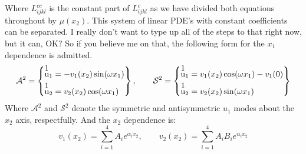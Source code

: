 \documentclass[11pt]{article}
\begin{document}
Where $L^{cc}_{ijkl}$ is the constant part of $L^{c}_{ijkl}$ as we have divided both equations throughout by $\mu(x_2)$.
This system of linear PDE's with constant coefficients can be separated. I really don't want to type up all of the steps to that right now, but it can, OK? So if you believe me on that, the following form for the $x_1$ dependence is admitted.
\begin{equation}
\mathcal{A}^2 = 
\left \{ 
\begin{aligned} 
  \stackon{u}{1}_1 &= -v_1(x_2)\sin(\omega x_1) \\
  \stackon{u}{1}_2 &=  v_2(x_2)\cos(\omega x_1)
\end{aligned} 
\right \} , \qquad
\mathcal{S}^2 = 
\left \{ 
\begin{aligned} 
  \stackon{u}{1}_1 &= v_1(x_2)\cos(\omega x_1) - v_1(0) \\
  \stackon{u}{1}_2 &=  v_2(x_2)\sin(\omega x_1)
\end{aligned} 
\right \}
\end{equation}
Where $\mathcal{A}^2$ and $\mathcal{S}^2$ denote the symmetric and antisymmetric $u_1$ modes about the $x_2$ axis, respectfully. And the $x_2$ dependence is:
\begin{equation}
v_1(x_2) = \sum_{i = 1}^{4}A_ie^{\alpha_i x_2}, \qquad v_2(x_2) = \sum_{i = 1}^{4} A_i B_i e^{\alpha_i x_2}
\end{equation} 
\end{document}
